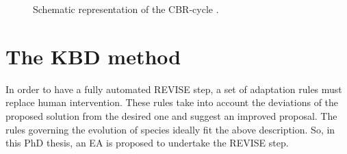 \begin{figure}[h!]
\begin{minipage}[b]{1\linewidth}
 \centering
\end{minipage}
\caption{Schematic representation of the CBR-cycle  \cite{aamond_plaza_1994}.} 
\label{cbr}
\end{figure}


\section{The KBD method}


In order to have a fully automated REVISE step, a set of adaptation rules must replace human intervention. These rules take into account the deviations of the proposed solution from the desired one and suggest an improved proposal. The rules governing the evolution of species ideally fit the above description. So, in this PhD thesis, an EA is proposed to undertake the REVISE step. 


